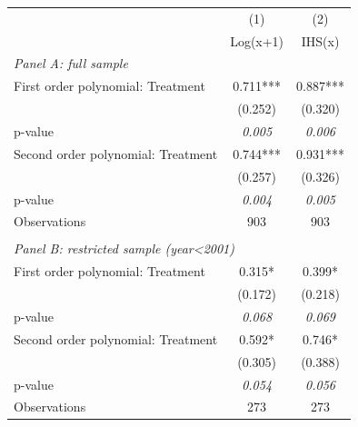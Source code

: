 \begin{tabular}{lcc}
 & (1) & (2) \\
 & Log(x+1) & IHS(x) \\
\multicolumn{3}{l}{\textit{Panel A: full sample}} \\
First order polynomial: Treatment & 0.711*** & 0.887*** \\
 & (0.252) & (0.320) \\
p-value & \textit{0.005} & \textit{0.006} \\
Second order polynomial: Treatment & 0.744*** & 0.931*** \\
 & (0.257) & (0.326) \\
p-value & \textit{0.004} & \textit{0.005} \\
Observations & 903 & 903 \\
 & & \\
\multicolumn{3}{l}{\textit{Panel B: restricted sample (year<2001)}} \\
First order polynomial: Treatment & 0.315* & 0.399* \\
 & (0.172) & (0.218) \\
p-value & \textit{0.068} & \textit{0.069} \\
Second order polynomial: Treatment & 0.592* & 0.746* \\
 & (0.305) & (0.388) \\
p-value & \textit{0.054} & \textit{0.056} \\
Observations & 273 & 273 \\
\end{tabular}
